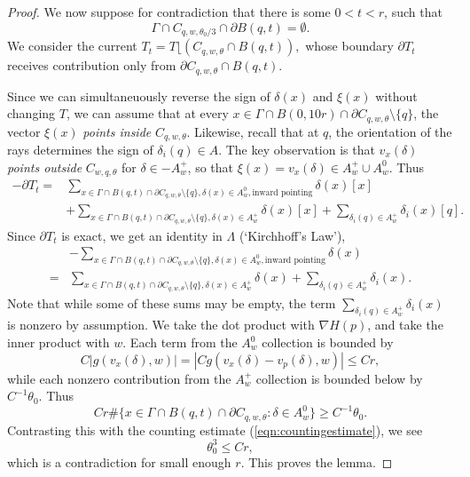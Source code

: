 \documentclass{article}
\theoremstyle{definition}
\begin{document}
\begin{proof}
We now suppose for contradiction that there is some $0<t< r$, such that 
\[
\Gamma\cap C_{q,w,\theta_0/3}\cap \partial B(q,t)= \emptyset.
\]
We consider the current 
$
T_t= T\lfloor (C_{q,w,\theta}\cap B(q,t)  ),
$
whose boundary $\partial T_t$ receives contribution only from $\partial C_{q,w,\theta}\cap B(q,t)$.





Since we can simultaneuously reverse the sign of $\delta(x)$ and $\xi(x)$ without changing $T$, we can assume that at every $x\in \Gamma \cap B(0,10r)\cap \partial C_{q,w,\theta}\setminus \{q\}$, the vector $\xi(x)$ \emph{points inside}  $C_{q,w,\theta}$. 
Likewise, recall that at $q$, the orientation of the rays determines the sign of $\delta_i(q)\in A$. The key observation is that $v_x(\delta)$ \emph{points outside} $C_{w,q,\theta}$ for $\delta\in -A_w^+$, so that $\xi(x)=v_x(\delta)\in A_w^+\cup A_w^0$.
Thus
\[
\begin{split}
-\partial T_t=& \sum_{ x\in \Gamma \cap B(q,t)\cap \partial C_{q,w,\theta}\setminus \{q\} , \delta(x)\in A_w^0, \text{inward pointing}}  \delta(x) [x]
\\
&
+ \sum_{ x\in \Gamma \cap B(q,t)\cap \partial C_{q,w,\theta}\setminus \{q\} , \delta(x)\in A_w^+}  \delta(x)[x]
+ \sum_{ \delta_i(q)\in A_w^+}  \delta_i(x) [q].
\end{split}
\]
Since $\partial T_t$ is exact, we get an identity in $\Lambda$ (`Kirchhoff's Law'),
\[
\begin{split}
&   - \sum_{ x\in \Gamma \cap B(q,t)\cap \partial C_{q,w,\theta}\setminus \{q\} , \delta(x)\in A_w^0, \text{inward pointing}}  \delta(x)
	\\
	=&  
	\sum_{ x\in \Gamma \cap B(q,t)\cap \partial C_{q,w,\theta}\setminus \{q\} , \delta(x)\in A_w^+}  \delta(x)
	+ \sum_{ \delta_i(q)\in A_w^+}  \delta_i(x) .
\end{split}
\]
Note that while some of these sums may be empty, the term $\sum_{ \delta_i(q)\in A_w^+}  \delta_i(x) $ is nonzero by assumption.
We take the dot product with $\nabla H(p)$, and take the inner product with $w$. Each term from the $A_w^0$ collection is bounded by 
\[
C | g(v_x(\delta), w) |=  |C g( v_x(\delta)- v_p(\delta),   w ) |\leq C r ,
\]
while each nonzero contribution from the $A_w^+$ collection is bounded below by $C^{-1} \theta_0$. Thus 
\[
Cr \# \{ x\in     \Gamma \cap  B(q, t) \cap \partial C_{q,w,\theta}:  \delta\in A_w^0          \} \geq C^{-1}\theta_0.
\]
Contrasting this with the counting estimate (\ref{eqn:countingestimate}), we see
\[
\theta_0^3 \leq Cr,
\]
which is a contradiction for small enough $r$. This proves  the lemma.
\end{proof}
			
\end{document}
